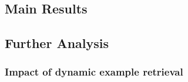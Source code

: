 \documentclass[conference]{IEEEtran}
\begin{document}




\subsection{Main Results}

\subsection{Further Analysis}
\subsubsection{Impact of dynamic example retrieval}

\end{document}
